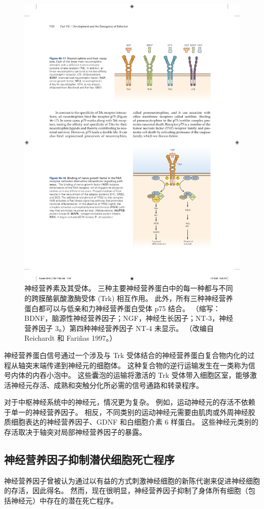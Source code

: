 \begin{figure}[htbp]
	\centering
	\includegraphics[width=0.7\linewidth]{chap46/fig_46_17}
	\caption{神经营养素及其受体。 三种主要神经营养蛋白中的每一种都与不同的跨膜酪氨酸激酶受体 (Trk) 相互作用。 此外，所有三种神经营养蛋白都可以与低亲和力神经营养蛋白受体 p75 结合。 （缩写：BDNF，脑源性神经营养因子；NGF，神经生长因子；NT-3，神经营养因子 3。）第四种神经营养因子 NT-4 未显示。 （改编自 Reichardt 和 Fariñas 1997。）}
	\label{fig:46_17}
\end{figure}

神经营养蛋白信号通过一个涉及与 Trk 受体结合的神经营养蛋白复合物内化的过程从轴突末端传递到神经元的细胞体。 这种复合物的逆行运输发生在一类称为信号内体的内吞小泡中。 这些囊泡的运输将激活的 Trk 受体带入细胞区室，能够激活神经元存活、成熟和突触分化所必需的信号通路和转录程序。

对于中枢神经系统中的神经元，情况更为复杂。 例如，运动神经元的存活不依赖于单一的神经营养因子。 相反，不同类别的运动神经元需要由肌肉或外周神经胶质细胞表达的神经营养因子、GDNF 和白细胞介素 6 样蛋白。 这些神经元类别的存活取决于轴突对局部神经营养因子的暴露。

\subsection{神经营养因子抑制潜伏细胞死亡程序}
神经营养因子曾被认为通过以有益的方式刺激神经细胞的新陈代谢来促进神经细胞的存活，因此得名。 然而，现在很明显，神经营养因子抑制了身体所有细胞（包括神经元）中存在的潜在死亡程序。

